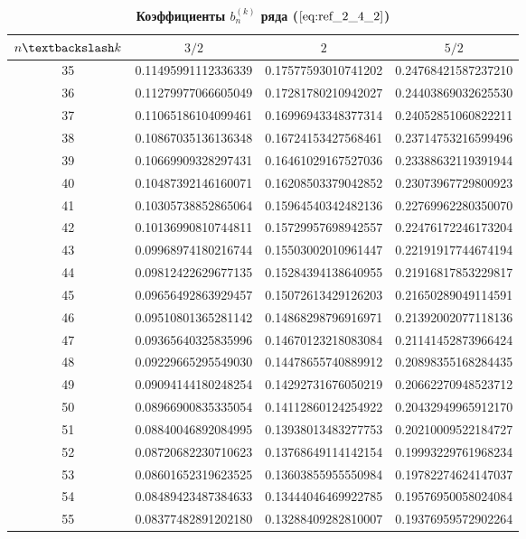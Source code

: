 \begin{table}[]
\caption{\textbf{Коэффициенты $b_n^{(k)}$ ряда ($\ref{eq:ref_2_4_2}$)}}
\begin{center}
\begin{tabular}{|c|c|c|c|}
\hline
$n \textbackslash k$ & $3/2$ & $2$ & $5/2$ \\
\hline
35 & 0.11495991112336339 & 0.17577593010741202 & 0.24768421587237210 \\
36 & 0.11279977066605049 & 0.17281780210942027 & 0.24403869032625530 \\
37 & 0.11065186104099461 & 0.16996943348377314 & 0.24052851060822211 \\
38 & 0.10867035136136348 & 0.16724153427568461 & 0.23714753216599496 \\
39 & 0.10669909328297431 & 0.16461029167527036 & 0.23388632119391944 \\
40 & 0.10487392146160071 & 0.16208503379042852 & 0.23073967729800923 \\
41 & 0.10305738852865064 & 0.15964540342482136 & 0.22769962280350070 \\
42 & 0.10136990810744811 & 0.15729957698942557 & 0.22476172246173204 \\
43 & 0.09968974180216744 & 0.15503002010961447 & 0.22191917744674194 \\
44 & 0.09812422629677135 & 0.15284394138640955 & 0.21916817853229817 \\
45 & 0.09656492863929457 & 0.15072613429126203 & 0.21650289049114591 \\
46 & 0.09510801365281142 & 0.14868298796916971 & 0.21392002077118136 \\
47 & 0.09365640325835996 & 0.14670123218083084 & 0.21141452873966424 \\
48 & 0.09229665295549030 & 0.14478655740889912 & 0.20898355168284435 \\
49 & 0.09094144180248254 & 0.14292731676050219 & 0.20662270948523712 \\
50 & 0.08966900835335054 & 0.14112860124254922 & 0.20432949965912170 \\
51 & 0.08840046892084995 & 0.13938013483277753 & 0.20210009522184727 \\
52 & 0.08720682230710623 & 0.13768649114142154 & 0.19993229761968234 \\
53 & 0.08601652319623525 & 0.13603855955550984 & 0.19782274624147037 \\
54 & 0.08489423487384633 & 0.13444046469922785 & 0.19576950058024084 \\
55 & 0.08377482891202180 & 0.13288409282810007 & 0.19376959572902264 \\

\end{tabular}
\end{center}
\end{table}
